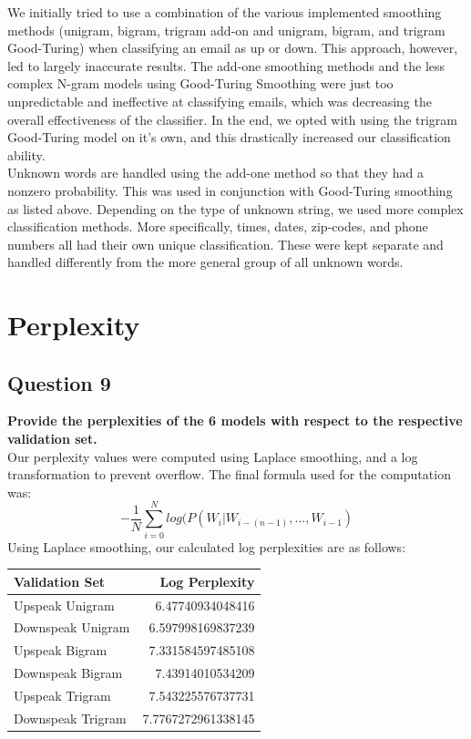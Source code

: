 \documentclass{article} %
\begin{document}
We initially tried to use a combination of the various implemented smoothing methods (unigram, bigram, trigram add-on and unigram, bigram, and trigram Good-Turing) when classifying an email as up or down. This approach, however, led to largely inaccurate results. The add-one smoothing methods and the less complex N-gram models using Good-Turing Smoothing were just too unpredictable and ineffective at classifying emails, which was decreasing the overall effectiveness of the classifier. In the end, we opted with using the trigram Good-Turing model on it's own, and this drastically increased our classification ability.\\

Unknown words are handled using the add-one method so that they had a nonzero probability. This was used in conjunction with Good-Turing smoothing as listed above. Depending on the type of unknown string, we used more complex classification methods. More specifically, times, dates, zip-codes, and phone numbers all had their own unique classification. These were kept separate and handled differently from the more general group of all unknown words.

\section{Perplexity}

\subsection*{Question 9}

\textbf{Provide the perplexities of the 6 models with respect to the respective validation set.}
\\

Our perplexity values were computed using Laplace smoothing, and a log transformation to prevent overflow. The final formula used for the computation was:
$$
- \frac{1}{N} \sum\limits_{i = 0}^N log(P(W_i|W_{i - (n-1)},...,W_{i-1})
$$
Using Laplace smoothing, our calculated log perplexities are as follows: \\

\begin{center}
\begin{tabular}{ l | r}
	\hline
		Validation Set & Log Perplexity \\
	\hline
		Upspeak Unigram & 6.47740934048416 \\
		Downspeak Unigram & 6.597998169837239 \\
		Upspeak Bigram & 7.331584597485108 \\
		Downspeak Bigram & 7.43914010534209 \\
		Upspeak Trigram & 7.543225576737731 \\
		Downspeak Trigram & 7.7767272961338145 \\
	\hline
\end{tabular}
\end{center}
\end{document}
